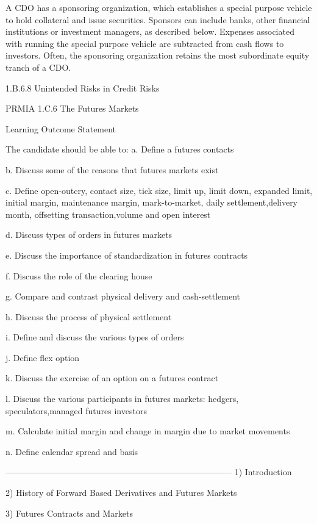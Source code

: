A CDO has a sponsoring organization, which establishes a special purpose vehicle to hold collateral and issue securities. Sponsors can include banks, other financial institutions or investment managers, as described below. Expenses associated with running the special purpose vehicle are subtracted from cash flows to investors. Often, the sponsoring organization retains the most subordinate equity tranch of a CDO.
 
1.B.6.8 Unintended Risks in Credit Risks


\newpage


PRMIA 1.C.6 The Futures Markets

Learning Outcome Statement

The candidate should be able to:
a.
  Define a futures contacts

b.
  Discuss some of the reasons that futures markets exist

c.
  Define open-outcry, contact size, tick size, limit up, limit down, expanded limit, initial margin, maintenance margin, mark-to-market, daily settlement,delivery month, offsetting          transaction,volume and open interest

d.
  Discuss types of orders in futures markets

e.
  Discuss the importance of standardization in futures contracts

f.
  Discuss the role of the clearing house

g.
  Compare and contrast physical delivery and cash-settlement

h.
  Discuss the process of physical settlement

i.
  Define and discuss the various types of orders

j.
  Define flex option

k.
  Discuss the exercise of an option on a futures contract

l.
  Discuss the various participants in futures markets: hedgers, speculators,managed futures investors

m.
  Calculate initial margin and change in margin due to market movements

n.
  Define calendar spread and basis




--------------------------------------------------------------------------------
1) Introduction

2) History of Forward Based Derivatives and Futures Markets

3) Futures Contracts and Markets

